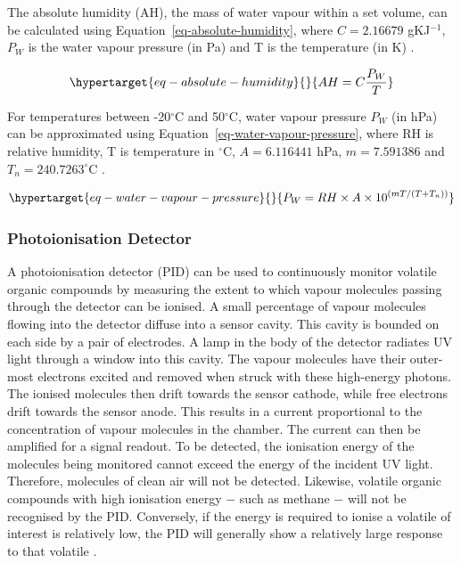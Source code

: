 \documentclass[
  a4paper,
]{scrbook}
\begin{document}
The absolute humidity (AH), the mass of water vapour within a set
volume, can be calculated using Equation~\ref{eq-absolute-humidity},
where \(C = 2.16679\) gKJ\(^{-1}\), \(P_W\) is the water vapour pressure
(in Pa) and T is the temperature (in K) \autocite{humidityformula}.

\begin{equation}\protect\hypertarget{eq-absolute-humidity}{}{
AH = C\frac{P_W}{T}
}\label{eq-absolute-humidity}\end{equation}

For temperatures between -20\(^\circ\)C and 50\(^\circ\)C, water vapour
pressure \(P_W\) (in hPa) can be approximated using
Equation~\ref{eq-water-vapour-pressure}, where RH is relative humidity,
T is temperature in \(^\circ\)C, \(A = 6.116441\) hPa, \(m = 7.591386\)
and \(T_{n} = 240.7263^\circ\)C \autocite{humidityformula}.

\begin{equation}\protect\hypertarget{eq-water-vapour-pressure}{}{
P_W = RH \times A \times 10^{(mT/(T+T_{n}))}
}\label{eq-water-vapour-pressure}\end{equation}

\hypertarget{photoionisation-detector}{%
\subsubsection*{Photoionisation
Detector}\label{photoionisation-detector}}

A photoionisation detector (PID) can be used to continuously monitor
volatile organic compounds by measuring the extent to which vapour
molecules passing through the detector can be ionised. A small
percentage of vapour molecules flowing into the detector diffuse into a
sensor cavity. This cavity is bounded on each side by a pair of
electrodes. A lamp in the body of the detector radiates UV light through
a window into this cavity. The vapour molecules have their outer-most
electrons excited and removed when struck with these high-energy
photons. The ionised molecules then drift towards the sensor cathode,
while free electrons drift towards the sensor anode. This results in a
current proportional to the concentration of vapour molecules in the
chamber. The current can then be amplified for a signal readout. To be
detected, the ionisation energy of the molecules being monitored cannot
exceed the energy of the incident UV light. Therefore, molecules of
clean air will not be detected. Likewise, volatile organic compounds
with high ionisation energy \(-\) such as methane \(-\) will not be
recognised by the PID. Conversely, if the energy is required to ionise a
volatile of interest is relatively low, the PID will generally show a
relatively large response to that volatile
\autocite{Ionscience,PIDmanual}.
\end{document}
